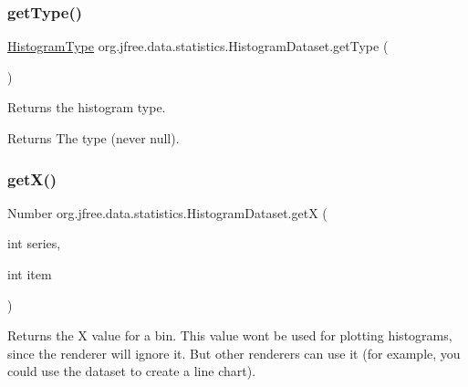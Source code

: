 \mbox{\label{classorg_1_1jfree_1_1data_1_1statistics_1_1_histogram_dataset_aafe9272c17cc894ec306d665a49316b6}} 
\subsubsection{\texorpdfstring{get\+Type()}{getType()}}
{\footnotesize\ttfamily \mbox{\hyperlink{classorg_1_1jfree_1_1data_1_1statistics_1_1_histogram_type}{Histogram\+Type}} org.\+jfree.\+data.\+statistics.\+Histogram\+Dataset.\+get\+Type (\begin{DoxyParamCaption}{ }\end{DoxyParamCaption})}

Returns the histogram type.

\begin{DoxyReturn}{Returns}
The type (never {\ttfamily null}). 
\end{DoxyReturn}
\mbox{\label{classorg_1_1jfree_1_1data_1_1statistics_1_1_histogram_dataset_a0d0b61165a8016d43005d1d4a41b0c79}} 
\subsubsection{\texorpdfstring{get\+X()}{getX()}}
{\footnotesize\ttfamily Number org.\+jfree.\+data.\+statistics.\+Histogram\+Dataset.\+getX (\begin{DoxyParamCaption}\item[{int}]{series,  }\item[{int}]{item }\end{DoxyParamCaption})}

Returns the X value for a bin. This value won\textquotesingle{}t be used for plotting histograms, since the renderer will ignore it. But other renderers can use it (for example, you could use the dataset to create a line chart).


